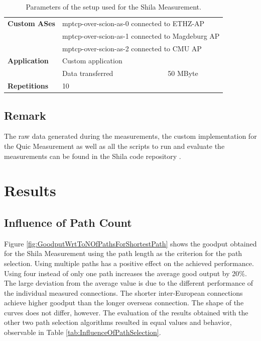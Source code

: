 \begin{table} [H]
	\centering
	\caption{Parameters of the setup used for the Shila Measurement.}
	\begin{tabular}{lll} 
		\toprule
		\textbf{Custom ASes} 		& \multicolumn{2}{l}{mptcp-over-scion-as-0 connected to ETHZ-AP}				\\
		& \multicolumn{2}{l}{mptcp-over-scion-as-1 connected to Magdeburg AP}			\\
		& \multicolumn{2}{l}{mptcp-over-scion-as-2 connected to CMU AP}					\smallskip \\ 
		\textbf{Application}		& Custom application						&								\\
		& Data transferred								& 50 MByte						\smallskip\\
		\textbf{Repetitions} 		& 10 											&								\\
		\bottomrule
	\end{tabular}
	\label{tab:ParameterQuicMeasurement}
\end{table}

\subsection*{Remark}
\label{subsec:SetupRemarks}

The raw data generated during the measurements, the custom implementation for the Quic Measurement as well as all the scripts to run and evaluate the measurements can be found in the Shila code repository \cite{ShilaGithub}.

\section{Results}
\label{sec:Results}

\subsection*{Influence of Path Count}
\label{subsec:InfluencePathCount}

Figure \ref{fig:GoodputWrtToNOfPathsForShortestPath} shows the goodput obtained for the Shila Measurement using the path length as the criterion for the path selection. Using multiple paths has a positive effect on the achieved performance.  Using four instead of only one path increases the average good output by 20\%. The large deviation from the average value is due to the different performance of the individual measured connections. The shorter inter-European connections achieve higher goodput than the longer overseas connection. The shape of the curves does not differ, however. The evaluation of the results obtained with the other two path selection algorithms resulted in equal values and behavior, observable in Table \ref{tab:InfluenceOfPathSelection}.

